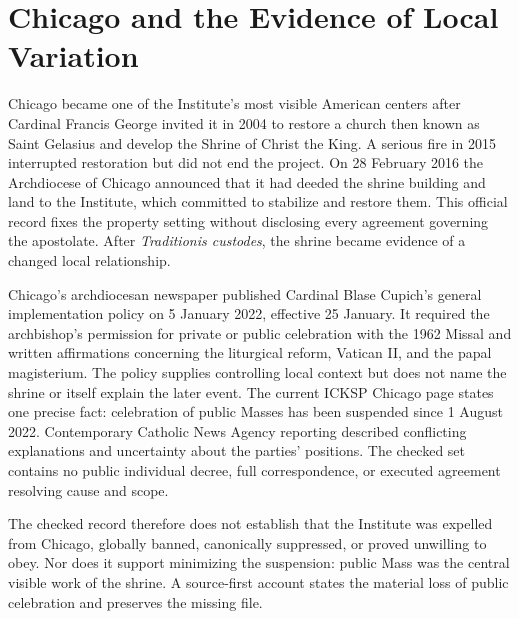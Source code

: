 \section{Chicago and the Evidence of Local Variation}

Chicago became one of the Institute's most visible American centers after Cardinal Francis George invited it in 2004 to restore a church then known as Saint Gelasius and develop the Shrine of Christ the King. A serious fire in 2015 interrupted restoration but did not end the project. On 28 February 2016 the Archdiocese of Chicago announced that it had deeded the shrine building and land to the Institute, which committed to stabilize and restore them. This official record fixes the property setting without disclosing every agreement governing the apostolate. After \emph{Traditionis custodes}, the shrine became evidence of a changed local relationship.

Chicago's archdiocesan newspaper published Cardinal Blase Cupich's general implementation policy on 5 January 2022, effective 25 January. It required the archbishop's permission for private or public celebration with the 1962 Missal and written affirmations concerning the liturgical reform, Vatican II, and the papal magisterium. The policy supplies controlling local context but does not name the shrine or itself explain the later event. The current ICKSP Chicago page states one precise fact: celebration of public Masses has been suspended since 1 August 2022. Contemporary Catholic News Agency reporting described conflicting explanations and uncertainty about the parties' positions. The checked set contains no public individual decree, full correspondence, or executed agreement resolving cause and scope.

The checked record therefore does not establish that the Institute was expelled from Chicago, globally banned, canonically suppressed, or proved unwilling to obey. Nor does it support minimizing the suspension: public Mass was the central visible work of the shrine. A source-first account states the material loss of public celebration and preserves the missing file.


